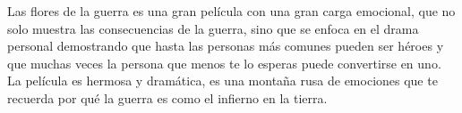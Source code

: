\documentclass[letterpaper, 12pt]{report}
\begin{document}
Las flores de la guerra es una gran película con
una gran carga emocional, que no solo muestra las
consecuencias de la guerra, sino que se enfoca en el drama
personal demostrando que hasta las personas más comunes
pueden ser héroes y que muchas veces la persona que menos
te lo esperas puede convertirse en uno. La película es
hermosa y dramática, es una montaña rusa de emociones que
te recuerda por qué la guerra es como el infierno en la
tierra.

\newpage

\printbibliography
\end{document}
